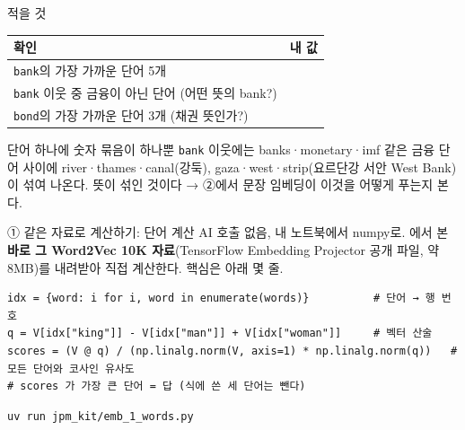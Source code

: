 \begin{frame}{ \circzero{} 적을 것}
\begin{tabularx}{\textwidth}{@{}X p{6cm}@{}}
\toprule
\textbf{확인} & \textbf{내 값} \\
\midrule
\texttt{bank}의 가장 가까운 단어 5개 & \\[4pt]
\texttt{bank} 이웃 중 금융이 아닌 단어 (어떤 뜻의 bank?) & \\[4pt]
\texttt{bond}의 가장 가까운 단어 3개 (채권 뜻인가?) & \\[4pt]
\bottomrule
\end{tabularx}
\vspace{0.6em}
\begin{alertblock}{단어 하나에 숫자 묶음이 하나뿐}
\small \texttt{bank} 이웃에는 banks·monetary·imf 같은 금융 단어 사이에 river·thames·canal(강둑), gaza·west·strip(요르단강 서안 West Bank)이 섞여 나온다. 뜻이 섞인 것이다 → ②에서 문장 임베딩이 이것을 어떻게 푸는지 본다.
\end{alertblock}
\end{frame}

\begin{frame}[fragile]{ ① 같은 자료로 계산하기: 단어 계산}
\small
AI 호출 없음, 내 노트북에서 numpy로. \circzero{}에서 본 \textbf{바로 그 Word2Vec 10K 자료}(TensorFlow Embedding Projector 공개 파일, 약 8MB)를 내려받아 직접 계산한다. 핵심은 아래 몇 줄.
\vspace{0.3em}
\begin{Verbatim}
idx = {word: i for i, word in enumerate(words)}          # 단어 → 행 번호
q = V[idx["king"]] - V[idx["man"]] + V[idx["woman"]]     # 벡터 산술
scores = (V @ q) / (np.linalg.norm(V, axis=1) * np.linalg.norm(q))   # 모든 단어와 코사인 유사도
# scores 가 가장 큰 단어 = 답 (식에 쓴 세 단어는 뺀다)
\end{Verbatim}
\vspace{0.3em}
\begin{Verbatim}
uv run jpm_kit/emb_1_words.py
\end{Verbatim}
\end{frame}

